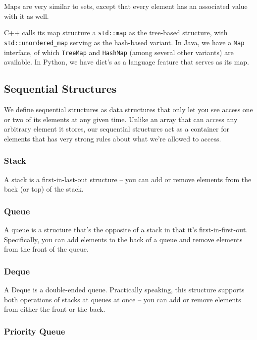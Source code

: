 Maps are very similar to sets, except that every element has an associated value with it as well.

C++ calls its map structure a \texttt{std::map} as the tree-based structure, with \texttt{std::unordered_map} serving as the hash-based variant. In Java, we have a \texttt{Map} interface, of which \texttt{TreeMap} and \texttt{HashMap} (among several other variants) are available. In Python, we have dict's as a language feature that serves as its map.

\subsection{Sequential Structures}

We define sequential structures as data structures that only let you see access one or two of its elements at any given time. Unlike an array that can access any arbitrary element it stores, our sequential structures act as a container for elements that has very strong rules about what we're allowed to access.

\subsubsection{Stack}

A stack is a first-in-last-out structure -- you can add or remove elements from the back (or top) of the stack.

\subsubsection{Queue}

A queue is a structure that's the opposite of a stack in that it's first-in-first-out. Specifically, you can add elements to the back of a queue and remove elements from the front of the queue.

\subsubsection{Deque}

A Deque is a double-ended queue. Practically speaking, this structure supports both operations of stacks at queues at once -- you can add or remove elements from either the front or the back.

\subsubsection{Priority Queue}

